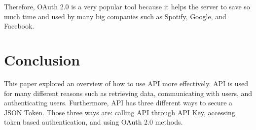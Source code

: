 \documentclass[11pt]{article}
\begin{document}
Therefore, OAuth 2.0 is a very popular tool because it helps the server to save so much time and used by many big companies such as Spotify, Google, and Facebook.

\section{Conclusion}
This paper explored an overview of how to use API more effectively. API is used for many different reasons such as retrieving data, communicating with users, and authenticating users. Furthermore, API has three different ways to secure a JSON Token. Those three ways are: calling API through API Key, accessing token based authentication, and using OAuth 2.0 methods.



\end{document}
